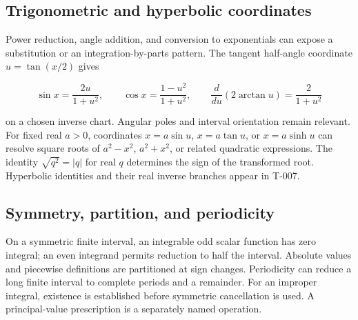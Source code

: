 \documentclass[11pt,oneside,openany]{book}
\begin{document}
\par\addvspace{8pt}\noindent\begin{minipage}{\linewidth}
\subsection{Trigonometric and hyperbolic coordinates}

Power reduction, angle addition, and conversion to exponentials can expose a
substitution or an integration-by-parts pattern. The tangent half-angle coordinate
\(u=\tan(x/2)\) gives

\[
\sin x=\frac{2u}{1+u^2},\qquad \cos x=\frac{1-u^2}{1+u^2},
\qquad \frac{d}{du}\left(2\arctan u\right)=\frac{2}{1+u^2}
\]

on a chosen inverse chart. Angular poles and interval orientation remain relevant.
For fixed real \(a>0\), coordinates \(x=a\sin u\), \(x=a\tan u\), or \(x=a\sinh u\)
can resolve square roots of \(a^2-x^2\), \(a^2+x^2\), or related quadratic expressions.
The identity \(\sqrt{q^2}=|q|\) for real \(q\) determines the sign of the transformed
root. Hyperbolic identities and their real inverse branches appear in
T-007.

\end{minipage}\par
\par\addvspace{8pt}\noindent\begin{minipage}{\linewidth}
\subsection{Symmetry, partition, and periodicity}

On a symmetric finite interval, an integrable odd scalar function has zero
integral; an even integrand permits reduction to half the interval. Absolute
values and piecewise definitions are partitioned at sign changes. Periodicity
can reduce a long finite interval to complete periods and a remainder. For an
improper integral, existence is established before symmetric cancellation is
used. A principal-value prescription is a separately named operation.

\end{minipage}\par
\end{document}
